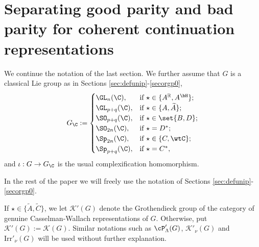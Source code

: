 \documentclass[12pt]{amsart}
\newcommand{\CK}{{\mathcal {K}}}
\newcommand{\CO}{{\mathcal {O}}}
\newcommand{\g}{\mathfrak g}
\newcommand{\R}{\mathbb R}
\newcommand{\be}{\begin {equation}}
\newcommand{\ee}{\end {equation}}
\numberwithin{equation}{section}
\theoremstyle{remark}
\def\Irr{\mathrm{Irr}}
\begin{document}
\section{Separating good parity and bad parity for coherent continuation  representations}\label{sec:GB}


We continue the notation of the last section. We further assume that $G$ is a classical Lie group as in Sections \ref{sec:defunip}-\ref{secorgp0},
\be\label{gc}
  G_\C :=
  \begin{cases}
   \GL_{n}(\C), & \textrm{if $\star\in \{A^\R, A^\bH\}$};\\
     \GL_{p+q}(\C), & \textrm{if $\star\in \{A, \widetilde A\}$};\\
    \SO_{p+q}(\C), & \textrm{if $\star\in \set{B,D}$};\\
    \SO_{2n}(\C), &\textrm{if $\star = D^{*}$};\\
    \Sp_{2n}(\C), &\textrm{if $\star \in \{C, \wtC\}$};\\
    \Sp_{p+q}(\C), &\textrm{if $\star = C^{*}$},\\
  \end{cases}
\ee
and $\iota: G\rightarrow G_\C$ is the usual complexification homomorphism.

In the rest of the paper we will freely use  the notation of Sections \ref{sec:defunip}-\ref{secorgp0}.


If $\star\in \{\widetilde A, \widetilde C\}$, we let $\CK'(G)$ denote the Grothendieck group of the category of genuine Casselman-Wallach representations of $G$. Otherwise, put $\CK'(G):=\CK(G)$. Similar notations such as $\cP'_\Lambda(G)$, $\CK'_{\nu}(G)$ and $\Irr'_{\nu}(G)$
will be used without further explanation.
\end{document}
